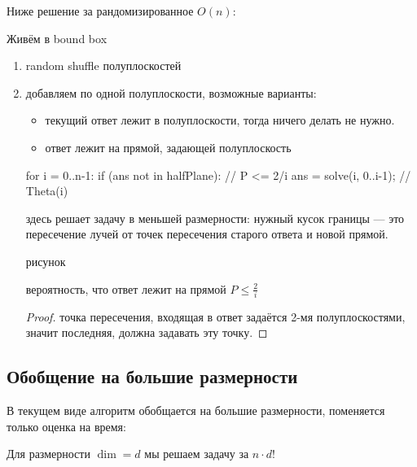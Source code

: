 Ниже решение за рандомизированное $O(n)$:

\begin{Rem}
    Живём в bound box
\end{Rem}

\begin{enumerate}
    \item random shuffle полуплоскостей
    \item добавляем по одной полуплоскости, возможные варианты: 
        \begin{itemize}
            \item текущий ответ лежит в полуплоскости, тогда ничего делать не нужно.
            \item ответ лежит на прямой, задающей полуплоскость
        \end{itemize}
        \begin{cppcode}
            for i = 0..n-1:
                if (ans not in halfPlane):  // P <= 2/i
                    ans = solve(i, 0..i-1); // Theta(i)
        \end{cppcode}

        здесь  решает задачу в меньшей размерности: нужный кусок
        границы --- это пересечение лучей от точек пересечения старого ответа
        и новой прямой.

        \TODO рисунок

        \begin{lemma}
            вероятность, что ответ лежит на прямой $P \leq \frac{2}{i}$
        \end{lemma}

        \begin{proof}
            точка пересечения, входящая в ответ задаётся 2-мя полуплоскостями,
            значит последняя, должна задавать эту точку.
        \end{proof}
\end{enumerate}

\subsection{Обобщение на большие размерности}

В текущем виде алгоритм обобщается на большие размерности, поменяется только
оценка на время:

\begin{theorem}
Для размерности $\dim = d$ мы решаем задачу за $n \cdot d!$
\end{theorem}

